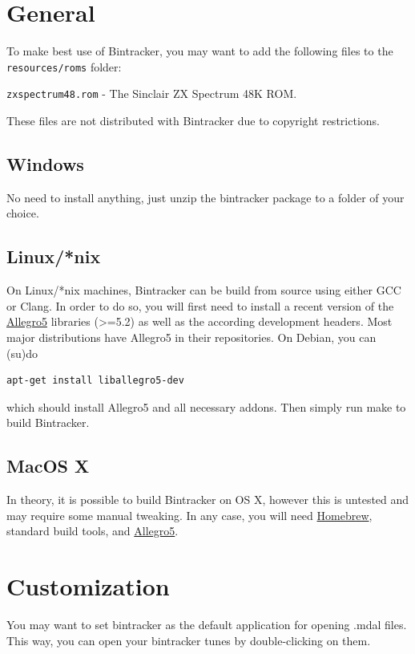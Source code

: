 \documentclass[12pt]{report}	%
\begin{document}
\section{General}
To make best use of Bintracker, you may want to add the following files to the \texttt{resources/roms} folder:

\texttt{zxspectrum48.rom} - The Sinclair ZX Spectrum 48K ROM.

These files are not distributed with Bintracker due to copyright restrictions.


\subsection{Windows}
No need to install anything, just unzip the bintracker package to a folder of your choice. 

\subsection{Linux/*nix}

On Linux/*nix machines, Bintracker can be build from source using either GCC or Clang. In order to do so, you will first need to install a recent version of the \href{http://liballeg.org/download.html}{Allegro5} libraries (>=5.2) as well as the according development headers. Most major distributions have Allegro5 in their repositories. On Debian, you can (su)do
\begin{verbatim}
apt-get install liballegro5-dev
\end{verbatim}
which should install Allegro5 and all necessary addons. Then simply run make to build Bintracker.


\subsection{MacOS X}
In theory, it is possible to build Bintracker on OS X, however this is untested and may require some manual tweaking. In any case, you will need \href{https://brew.sh/}{Homebrew}, standard build tools, and \href{http://liballeg.org/download.html}{Allegro5}.


\section{Customization}

You may want to set bintracker as the default application for opening .mdal files. This way, you can open your bintracker tunes by double-clicking on them.
\end{document}
